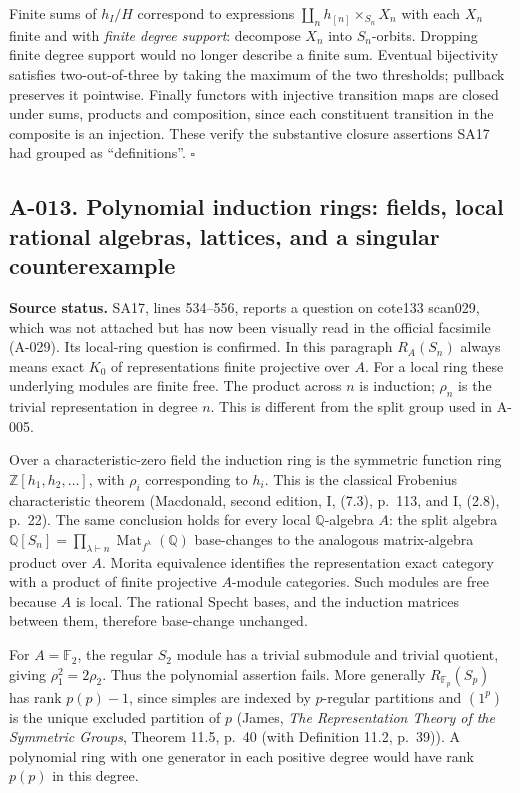 \documentclass[11pt]{article}
\begin{document}
Finite sums of $h_I/H$ correspond to expressions
$\coprod_n h_{[n]}\times_{S_n}X_n$ with each $X_n$ finite and with
\emph{finite degree support}: decompose $X_n$ into $S_n$-orbits.
Dropping finite degree support would no longer describe a finite
sum. Eventual bijectivity satisfies two-out-of-three by taking the
maximum of the two thresholds; pullback preserves it pointwise.
Finally functors with injective transition maps are closed under
sums, products and composition, since each constituent transition
in the composite is an injection. These verify the substantive
closure assertions SA17 had grouped as ``definitions''.
\hfill$\square$


\subsection*{A-013. Polynomial induction rings: fields, local rational algebras, lattices, and a singular counterexample}
\textbf{Source status.} SA17, lines 534--556, reports a question on
cote133 scan029, which was not attached but has now been visually
read in the official facsimile (A-029). Its local-ring question
is confirmed. In this paragraph $R_A(S_n)$
always means exact $K_0$ of representations finite projective over $A$.
For a local ring these underlying modules are finite free. The product
across $n$ is induction; $\rho_n$ is the trivial representation in degree
$n$. This is different from the split group used in A-005.

Over a characteristic-zero field the induction ring is the symmetric
function ring $\mathbb Z[h_1,h_2,\ldots]$, with $\rho_i$ corresponding to
$h_i$. This is the classical Frobenius characteristic theorem (Macdonald, second edition, I, (7.3), p.~113, and I, (2.8), p.~22). The same
conclusion holds for every local $\mathbb Q$-algebra $A$: the split
algebra $\mathbb Q[S_n]=\prod_{\lambda\vdash n}\operatorname{Mat}_{f^\lambda}(\mathbb Q)$
base-changes to the analogous matrix-algebra product over $A$.
Morita equivalence identifies the representation exact category with a
product of finite projective $A$-module categories. Such modules are
free because $A$ is local. The rational Specht bases, and the induction
matrices between them, therefore base-change unchanged.

For $A=\mathbb F_2$, the regular $S_2$ module has a trivial submodule
and trivial quotient, giving $\rho_1^2=2\rho_2$. Thus the polynomial
assertion fails. More generally $R_{\mathbb F_p}(S_p)$ has rank
$p(p)-1$, since simples are indexed by $p$-regular partitions and
$(1^p)$ is the unique excluded partition of $p$ (James, \emph{The
Representation Theory of the Symmetric Groups}, Theorem 11.5, p.~40 (with Definition 11.2, p.~39)). A polynomial ring with one generator in each
positive degree would have rank $p(p)$ in this degree.
\end{document}
